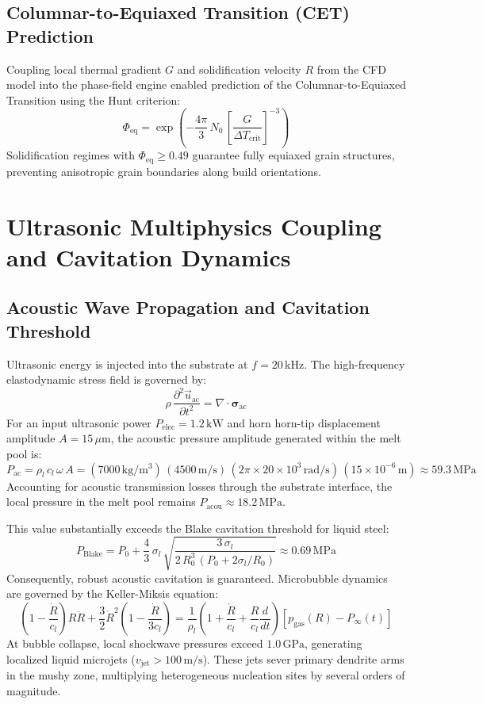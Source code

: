 \documentclass[10pt,a4paper]{article}
\begin{document}
\subsection{Columnar-to-Equiaxed Transition (CET) Prediction}
Coupling local thermal gradient \(G\) and solidification velocity \(R\) from the CFD model into the phase-field engine enabled prediction of the Columnar-to-Equiaxed Transition using the Hunt criterion:
\[
\Phi_{\mathrm{eq}} = \exp\left(-\frac{4\pi}{3}\,N_0\,\left[\frac{G}{\Delta T_{\mathrm{crit}}}\right]^{-3}\right)
\]
Solidification regimes with \(\Phi_{\mathrm{eq}} \ge 0.49\) guarantee fully equiaxed grain structures, preventing anisotropic grain boundaries along build orientations.

\section{Ultrasonic Multiphysics Coupling and Cavitation Dynamics}

\subsection{Acoustic Wave Propagation and Cavitation Threshold}
Ultrasonic energy is injected into the substrate at \(f = 20\,\mathrm{kHz}\). The high-frequency elastodynamic stress field is governed by:
\[
\rho\,\frac{\partial^2 \vec{u}_{\mathrm{ac}}}{\partial t^2} = \nabla \cdot \boldsymbol{\sigma}_{\mathrm{ac}}
\]
For an input ultrasonic power \(P_{\mathrm{elec}} = 1.2\,\mathrm{kW}\) and horn horn-tip displacement amplitude \(A = 15\,\mu\mathrm{m}\), the acoustic pressure amplitude generated within the melt pool is:
\[
P_{\mathrm{ac}} = \rho_l\,c_l\,\omega\,A = (7000\,\mathrm{kg/m^3})\,(4500\,\mathrm{m/s})\,(2\pi \times 20\times 10^3\,\mathrm{rad/s})\,(15\times 10^{-6}\,\mathrm{m}) \approx 59.3\,\mathrm{MPa}
\]
Accounting for acoustic transmission losses through the substrate interface, the local pressure in the melt pool remains \(P_{\mathrm{acou}} \approx 18.2\,\mathrm{MPa}\). 

This value substantially exceeds the Blake cavitation threshold for liquid steel:
\[
P_{\mathrm{Blake}} = P_0 + \frac{4}{3}\,\sigma_l\,\sqrt{\frac{3\,\sigma_l}{2\,R_0^3\,(P_0 + 2\sigma_l/R_0)}} \approx 0.69\,\mathrm{MPa}
\]
Consequently, robust acoustic cavitation is guaranteed. Microbubble dynamics are governed by the Keller-Miksis equation:
\[
\left(1 - \frac{\dot{R}}{c_l}\right) R \ddot{R} + \frac{3}{2}\dot{R}^2\left(1 - \frac{\dot{R}}{3 c_l}\right) = \frac{1}{\rho_l}\left(1 + \frac{\dot{R}}{c_l} + \frac{R}{c_l}\frac{d}{dt}\right)\left[p_{\mathrm{gas}}(R) - P_\infty(t)\right]
\]
At bubble collapse, local shockwave pressures exceed \(1.0\,\mathrm{GPa}\), generating localized liquid microjets (\(v_{\mathrm{jet}} > 100\,\mathrm{m/s}\)). These jets sever primary dendrite arms in the mushy zone, multiplying heterogeneous nucleation sites by several orders of magnitude.
\end{document}
